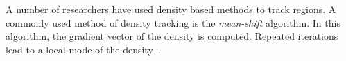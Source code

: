 A number of researchers have used density based methods to track regions.  A commonly used method of density tracking is the \emph{mean-shift} algorithm.  In this algorithm, the gradient vector of the density is computed.  Repeated iterations lead to a local mode of the density~\cite{2002_JNL_MeanShiftFeatureSpaceAnalysis_Comaniciu}.  

 

%


%
%
%

